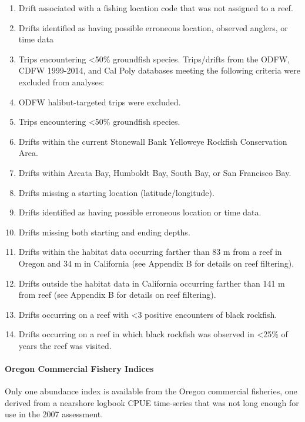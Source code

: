 \documentclass[11pt,
  english,
  letterpaper,
]{article}
\providecommand{\tightlist}{%
  \setlength{\itemsep}{0pt}\setlength{\parskip}{0pt}}
\providecommand{\tightlist}{%
  \setlength{\itemsep}{0pt}\setlength{\parskip}{0pt}}
\begin{document}
\begin{enumerate}
\def\labelenumi{\arabic{enumi}.}
\tightlist
\item
  Drift associated with a fishing location code that was not assigned to a reef.
\item
  Drifts identified as having possible erroneous location, observed anglers, or time data
\item
  Trips encountering \textless50\% groundfish species. Trips/drifts from the ODFW, CDFW 1999-2014, and Cal Poly databases meeting the following criteria were excluded from analyses:
\item
  ODFW halibut-targeted trips were excluded.
\item
  Trips encountering \textless50\% groundfish species.
\item
  Drifts within the current Stonewall Bank Yelloweye Rockfish Conservation Area.
\item
  Drifts within Arcata Bay, Humboldt Bay, South Bay, or San Francisco Bay.
\item
  Drifts missing a starting location (latitude/longitude).
\item
  Drifts identified as having possible erroneous location or time data.
\item
  Drifts missing both starting and ending depths.
\item
  Drifts within the habitat data occurring farther than 83 m from a reef in Oregon and 34 m in California (see Appendix B for details on reef filtering).
\item
  Drifts outside the habitat data in California occurring farther than 141 m from reef (see Appendix B for details on reef filtering).
\item
  Drifts occurring on a reef with \textless3 positive encounters of black rockfish.
\item
  Drifts occurring on a reef in which black rockfish was observed in \textless25\% of years the reef was visited.
\end{enumerate}

\hypertarget{oregon-commercial-fishery-indices}{%
\paragraph{Oregon Commercial Fishery Indices}\label{oregon-commercial-fishery-indices}}

Only one abundance index is available from the Oregon commercial fisheries, one derived from a nearshore logbook CPUE time-series that was not long enough for use in the 2007 assessment.
\end{document}
